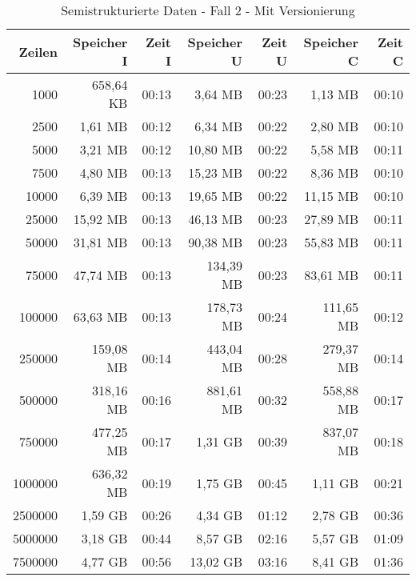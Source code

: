 \begin{table}[h!]
    \centering
    \begin{tabular}{|r|r|r|r|r|r|r|}
        \hline
        \textbf{Zeilen} & \textbf{Speicher I} & \textbf{Zeit I} & \textbf{Speicher U} & \textbf{Zeit U} & \textbf{Speicher C} & \textbf{Zeit C} \\ \hline
        1000    & 658,64 KB & 00:13 & 3,64 MB   & 00:23 & 1,13 MB   & 00:10 \\ \hline
        2500    & 1,61 MB   & 00:12 & 6,34 MB   & 00:22 & 2,80 MB   & 00:10 \\ \hline
        5000    & 3,21 MB   & 00:12 & 10,80 MB  & 00:22 & 5,58 MB   & 00:11 \\ \hline
        7500    & 4,80 MB   & 00:13 & 15,23 MB  & 00:22 & 8,36 MB   & 00:10 \\ \hline
        10000   & 6,39 MB   & 00:13 & 19,65 MB  & 00:22 & 11,15 MB  & 00:10 \\ \hline
        25000   & 15,92 MB  & 00:13 & 46,13 MB  & 00:23 & 27,89 MB  & 00:11 \\ \hline
        50000   & 31,81 MB  & 00:13 & 90,38 MB  & 00:23 & 55,83 MB  & 00:11 \\ \hline
        75000   & 47,74 MB  & 00:13 & 134,39 MB & 00:23 & 83,61 MB  & 00:11 \\ \hline
        100000  & 63,63 MB  & 00:13 & 178,73 MB & 00:24 & 111,65 MB & 00:12 \\ \hline
        250000  & 159,08 MB & 00:14 & 443,04 MB & 00:28 & 279,37 MB & 00:14 \\ \hline
        500000  & 318,16 MB & 00:16 & 881,61 MB & 00:32 & 558,88 MB & 00:17 \\ \hline
        750000  & 477,25 MB & 00:17 & 1,31 GB   & 00:39 & 837,07 MB & 00:18 \\ \hline
        1000000 & 636,32 MB & 00:19 & 1,75 GB   & 00:45 & 1,11 GB   & 00:21 \\ \hline
        2500000 & 1,59 GB   & 00:26 & 4,34 GB   & 01:12 & 2,78 GB   & 00:36 \\ \hline
        5000000 & 3,18 GB   & 00:44 & 8,57 GB   & 02:16 & 5,57 GB   & 01:09 \\ \hline
        7500000 & 4,77 GB   & 00:56 & 13,02 GB  & 03:16 & 8,41 GB   & 01:36 \\ \hline
    \end{tabular}
    \caption{Semistrukturierte Daten - Fall 2 - Mit Versionierung}
    \label{tab:sql-80-20-40-updated}
\end{table}














